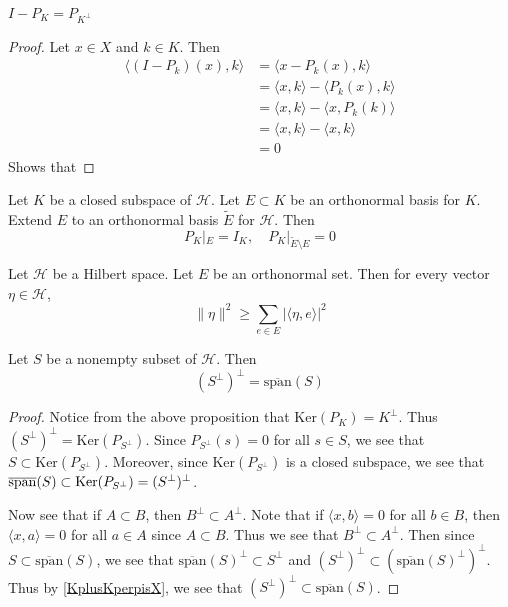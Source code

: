 
\begin{proposition}
  $I-P_K = P_{K^\perp}$
\end{proposition}
\begin{proof}
  Let $x \in X$ and $k \in K$. Then
  \begin{align*}
    \langle (I - P_k)(x), k \rangle &= \langle  x - P_k(x) , k \rangle \\
    &= \langle  x , k \rangle - \langle P_k(x) ,  k \rangle  \\
    &= \langle x , k \rangle  - \langle x , P_k(k) \rangle \\
    &= \langle x , k \rangle  - \langle  x , k \rangle  \\
    &= 0
  \end{align*}
  Shows that
\end{proof}

\begin{proposition}
  Let $K$ be a closed subspace of $\mathcal{H}$. Let $E \subset K$ be
  an orthonormal basis
  for $K$. Extend $E$ to an orthonormal basis $\tilde{E}$ for
  $\mathcal{H}$. Then \[
    P_K|_E = I_K, \quad P_K|_{\tilde{E} \setminus E} = 0
  \]
\end{proposition}

\begin{remark}
  Let $\mathcal{H}$ be a Hilbert space. Let $E$ be an orthonormal set. Then for
  every vector $\eta \in \mathcal{H}$, \[
    \|\eta\|^2 \ge \sum_{e \in E} |\langle \eta ,  e \rangle |^2
  \]
\end{remark}

\begin{lemma}
  \label{PerpPerpisSpan}
  Let $S$ be a nonempty subset of $\mathcal{H}$. Then \[
    (S^\perp)^\perp  = \overline{\textrm{span}}(S)
  \]
\end{lemma}
\begin{proof}
  Notice from the above proposition that $\textrm{Ker}(P_K) =
  K^\perp$. Thus $(S^\perp)^\perp = \textrm{Ker}(P_{S^\perp})$. Since
  $P_{S^\perp}(s) = 0$ for all $s \in S$, we see that $S \subset
  \textrm{Ker}(P_{S^\perp})$. Moreover, since
  $\textrm{Ker}(P_{S^\perp})$ is a closed subspace, we see that
  $\overline{ \textrm{\textrm{span}}}(S) \subset
  \textrm{Ker}(P_{S^\perp}) = ( S^\perp)^\perp$.

  Now see that if $A \subset B$, then $B^\perp \subset A^\perp$. Note
  that if $\langle  x , b \rangle  = 0$ for all $b \in B$, then
  $\langle  x , a \rangle =0$ for all $a \in A$ since $A \subset B$.
  Thus we see that $B^\perp \subset A^\perp$. Then since $S \subset
  \overline{\textrm{span}}(S)$, we see that
  $\overline{\textrm{span}}(S)^\perp \subset S^\perp$ and
  $(S^\perp)^\perp \subset
  (\overline{\textrm{span}}(S)^\perp)^\perp$. Thus by
  \autoref{KplusKperpisX}, we see that $(S^\perp)^\perp \subset
  \overline{\textrm{span}}(S)$.
\end{proof}

